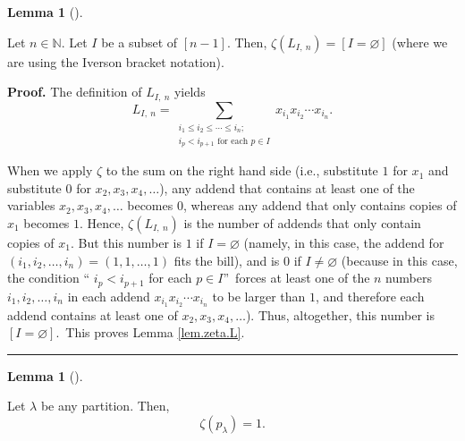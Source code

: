 \documentclass[numbers=enddot,12pt,final,onecolumn,notitlepage]{scrartcl}%
\numberwithin{exer}{section}
\theoremstyle{definition}
\newtheorem{lem}[theo]{Lemma}
\newenvironment{lemma}[1][]
{\begin{lem}[#1]\begin{leftbar}}
{\end{leftbar}\end{lem}}
\newenvironment{proof}[1][Proof]{\noindent\textbf{#1.} }{\ \rule{0.5em}{0.5em}}
\let\sumnonlimits\sum
\renewcommand{\sum}{\sumnonlimits\limits}
\begin{document}
\begin{lemma}
\label{lem.zeta.L}Let $n\in\mathbb{N}$. Let $I$ be a subset of $\left[
n-1\right]  $. Then, $\zeta\left(  L_{I,\ n}\right)  =\left[  I=\varnothing
\right]  $ (where we are using the Iverson bracket notation).
\end{lemma}

\begin{proof}
The definition of $L_{I,\ n}$ yields%
\[
L_{I,\ n}=\sum_{\substack{i_{1}\leq i_{2}\leq\cdots\leq i_{n};\\i_{p}%
<i_{p+1}\text{ for each }p\in I}}x_{i_{1}}x_{i_{2}}\cdots x_{i_{n}}.
\]


When we apply $\zeta$ to the sum on the right hand side (i.e., substitute $1$
for $x_{1}$ and substitute $0$ for $x_{2},x_{3},x_{4},\ldots$), any addend
that contains at least one of the variables $x_{2},x_{3},x_{4},\ldots$ becomes
$0$, whereas any addend that only contains copies of $x_{1}$ becomes $1$.
Hence, $\zeta\left(  L_{I,\ n}\right)  $ is the number of addends that only
contain copies of $x_{1}$. But this number is $1$ if $I=\varnothing$ (namely,
in this case, the addend for $\left(  i_{1},i_{2},\ldots,i_{n}\right)
=\left(  1,1,\ldots,1\right)  $ fits the bill), and is $0$ if $I\neq
\varnothing$ (because in this case, the condition \textquotedblleft%
$i_{p}<i_{p+1}$ for each $p\in I$\textquotedblright\ forces at least one of
the $n$ numbers $i_{1},i_{2},\ldots,i_{n}$ in each addend $x_{i_{1}}x_{i_{2}%
}\cdots x_{i_{n}}$ to be larger than $1$, and therefore each addend contains
at least one of $x_{2},x_{3},x_{4},\ldots$). Thus, altogether, this number is
$\left[  I=\varnothing\right]  $.\ This proves Lemma \ref{lem.zeta.L}.
\end{proof}

\begin{lemma}
\label{lem.zeta.p}Let $\lambda$ be any partition. Then,%
\[
\zeta\left(  p_{\lambda}\right)  =1.
\]

\end{lemma}
\end{document}
